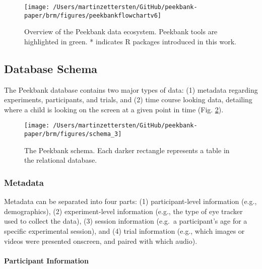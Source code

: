 \documentclass[
  english,
  man,floatsintext]{apa6}
\let\oldparagraph\paragraph
\renewcommand{\paragraph}[1]{\oldparagraph{#1}\mbox{}}
\begin{document}
\begin{figure}

{\centering \texttt{[image: /Users/martinzettersten/GitHub/peekbank-paper/brm/figures/peekbankflowchartv6]} 

}

\caption{Overview of the Peekbank data ecosystem. Peekbank tools are highlighted in green. * indicates R packages introduced in this work.}\label{fig:fig-framework-overview}
\end{figure}

\hypertarget{database-schema}{%
\subsection{Database Schema}\label{database-schema}}

The Peekbank database contains two major types of data: (1) metadata regarding experiments, participants, and trials, and (2) time course looking data, detailing where a child is looking on the screen at a given point in time (Fig. \ref{fig:fig-schema}).

\begin{figure}

{\centering \texttt{[image: /Users/martinzettersten/GitHub/peekbank-paper/brm/figures/schema\_3]} 

}

\caption{The Peekbank schema. Each darker rectangle represents a table in the relational database.}\label{fig:fig-schema}
\end{figure}

\hypertarget{metadata}{%
\subsubsection{Metadata}\label{metadata}}

Metadata can be separated into four parts: (1) participant-level information (e.g., demographics), (2) experiment-level information (e.g., the type of eye tracker used to collect the data), (3) session information (e.g.~a participant's age for a specific experimental session), and (4) trial information (e.g., which images or videos were presented onscreen, and paired with which audio).

\hypertarget{participant-information}{%
\paragraph{Participant Information}\label{participant-information}}
\end{document}
